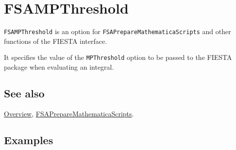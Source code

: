\documentclass[../FeynHelpersManual.tex]{subfiles}
\begin{document}
\begin{Shaded}
\begin{Highlighting}[]
 
\end{Highlighting}
\end{Shaded}

\hypertarget{fsampthreshold}{
\section{FSAMPThreshold}\label{fsampthreshold}}

\texttt{FSAMPThreshold} is an option for
\texttt{FSAPrepareMathematicaScripts} and other functions of the FIESTA
interface.

It specifies the value of the \texttt{MPThreshold} option to be passed
to the FIESTA package when evaluating an integral.

\subsection{See also}

\hyperlink{toc}{Overview},
\hyperlink{fsapreparemathematicascripts}{FSAPrepareMathematicaScripts}.

\subsection{Examples}
\end{document}

